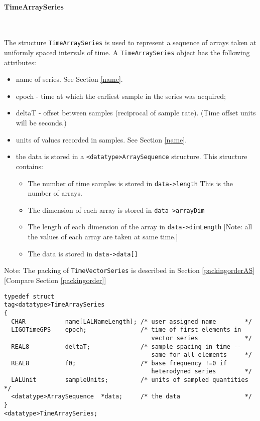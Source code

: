 \documentclass[]{ligodcc}
\renewcommand{\texttt}[1]{{\ttfamily\color{blue}#1}}
\begin{document}
\paragraph{{\texttt {TimeArraySeries}} }~


The structure {\tt TimeArraySeries} is used to represent a sequence of
arrays taken at uniformly spaced intervals of time. A {\tt TimeArraySeries}
object has the following attributes:

\begin{itemize}
\vspace{-0.15in}
\item
name of series. See Section \ref{name}.
\vspace{-0.15in}
\item
epoch  -  time at which the earliest sample in the series was acquired;
\vspace{-0.15in}
\item
deltaT  - offset between samples (reciprocal of sample rate).  (Time
offset units will be seconds.)
\vspace{-0.15in}
\item
units of values recorded in samples. See Section \ref{name}.
\vspace{-0.15in}
\item
the data is stored in a {\tt <datatype>ArraySequence}  structure. This
structure contains:
\begin{itemize}
\vspace{-0.10in}
\item
The number of time samples is stored in {\tt data->length} This is the
number of arrays.
\vspace{-0.10in}
\item
The dimension of each array is stored in {\tt data->arrayDim}
\vspace{-0.10in}
\item
The length of each dimension of the array in {\tt data->dimLength}
[Note:  all the values of each array are taken at same time.]
\vspace{-0.10in}
\item
The data is stored in {\tt data->data[]}
\end{itemize}
\end{itemize}

Note: The packing of {\tt TimeVectorSeries} is described in Section
\ref{packingorderAS} [Compare Section \ref{packingorder}]

{\footnotesize
\begin{verbatim}
typedef struct
tag<datatype>TimeArraySeries
{
  CHAR           name[LALNameLength]; /* user assigned name        */
  LIGOTimeGPS    epoch;               /* time of first elements in
                                         vector series             */
  REAL8          deltaT;              /* sample spacing in time --
                                         same for all elements     */
  REAL8          f0;                  /* base frequency !=0 if
                                         heterodyned series        */
  LALUnit        sampleUnits;         /* units of sampled quantities */
  <datatype>ArraySequence  *data;     /* the data                  */
}
<datatype>TimeArraySeries;
\end{verbatim}}
\end{document}

